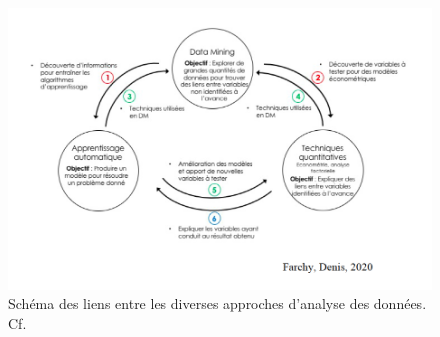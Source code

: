 \documentclass[a4paper,12pt,twoside]{book}
\begin{document}
    \begin{figure}[!h]
    \centering
    \includegraphics[width=13cm]{img/ML/liens_analyse_donnees.png}
    \caption{Schéma des liens entre les diverses approches d'analyse des données. Cf. \cite[p. 13]{Mission_IA_et_Culture}}
    \end{figure}
    
\end{document}
